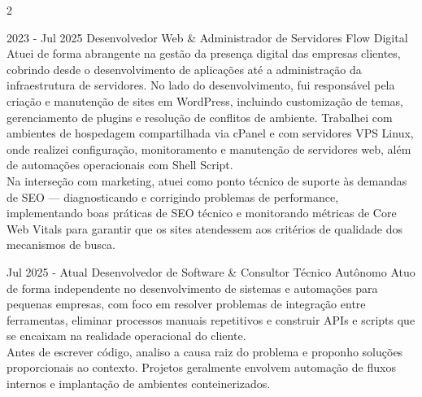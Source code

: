 \documentclass[10pt, a4paper]{article}
\begin{document}
\begin{paracol}{2}
\begin{rightcolumn}
\cvevent
  {2023 - Jul 2025}
  {Desenvolvedor Web \& Administrador de Servidores}
  {Flow Digital}
  {Atuei de forma abrangente na gestão da presença digital das empresas
  clientes, cobrindo desde o desenvolvimento de aplicações até a
  administração da infraestrutura de servidores. No lado do
  desenvolvimento, fui responsável pela criação e manutenção de sites em
  WordPress, incluindo customização de temas, gerenciamento de plugins e
  resolução de conflitos de ambiente. Trabalhei com ambientes de
  hospedagem compartilhada via cPanel e com servidores VPS Linux, onde
  realizei configuração, monitoramento e manutenção de servidores web,
  além de automações operacionais com Shell Script.\\[6pt]
  Na interseção com marketing, atuei como ponto técnico de suporte às
  demandas de SEO — diagnosticando e corrigindo problemas de performance,
  implementando boas práticas de SEO técnico e monitorando métricas de
  Core Web Vitals para garantir que os sites atendessem aos critérios de
  qualidade dos mecanismos de busca.}
  {}

\vspace{10pt}

\cvevent
  {Jul 2025 - Atual}
  {Desenvolvedor de Software \& Consultor Técnico}
  {Autônomo}
  {Atuo de forma independente no desenvolvimento de sistemas e
  automações para pequenas empresas, com foco em resolver problemas de
  integração entre ferramentas, eliminar processos manuais repetitivos e
  construir APIs e scripts que se encaixam na realidade operacional do
  cliente.\\[6pt]
  Antes de escrever código, analiso a causa raiz do problema e proponho
  soluções proporcionais ao contexto. Projetos geralmente envolvem
  automação de fluxos internos e implantação de ambientes
  conteinerizados.}
  {}


\end{rightcolumn}
\end{paracol}
\end{document}
